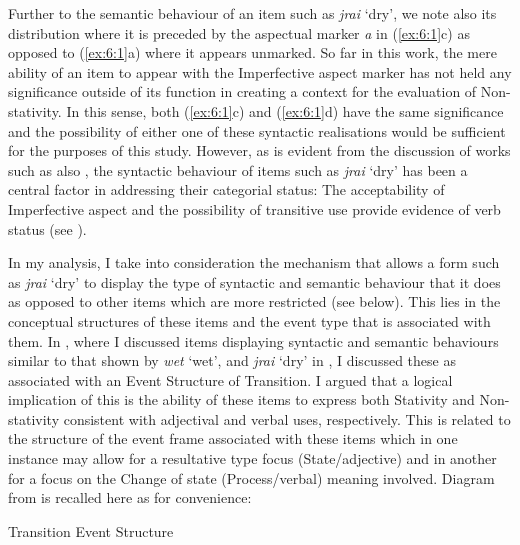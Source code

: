 Further to the semantic behaviour of an item such as \textit{jrai} `dry', we note also its distribution where it is preceded by the aspectual marker \textit{a} in (\ref{ex:6:1}c) as opposed to (\ref{ex:6:1}a) where it appears unmarked. So far in this work, the mere ability of an item to appear with the Imperfective aspect marker has not held any significance outside of its function in creating a context for the evaluation of Non-stativity. In this sense, both (\ref{ex:6:1}c) and (\ref{ex:6:1}d) have the same significance and the possibility of either one of these syntactic realisations would be sufficient for the purposes of this study. However, as is evident from the discussion of works such as \citet{Winford1993,Sebba1986,Seuren1986} also \citet{Kouwenberg1996}, the syntactic behaviour of items such as \textit{jrai} ‘dry’ has been a central factor in addressing their categorial status: The acceptability of Imperfective aspect and the possibility of transitive use provide evidence of verb status (see ). 

In my analysis, I take into consideration the mechanism that allows a form such as \textit{jrai} `dry' to display the type of syntactic and semantic behaviour that it does as opposed to other items which are more restricted (see  below). This lies in the conceptual structures of these items and the event type that is associated with them. In , where I discussed items displaying syntactic and semantic behaviours similar to that shown by \textit{wet} `wet', and \textit{jrai} `dry' in , I discussed these as associated with an Event Structure of Transition. I argued that a logical implication of this is the ability of these items to express both Stativity and Non-stativity consistent with adjectival and verbal uses, respectively. This is related to the structure of the event frame associated with these items which in one instance may allow for a resultative type focus (State\slash adjective) and in another for a focus on the Change of state (Process\slash verbal) meaning involved. Diagram  from  is recalled here as  for convenience: 

\ea%
 \label{ex:6:2} 
 Transition Event Structure \citep[56]{Pustejovsky1991}
\begin{center}\end{center}
\z


